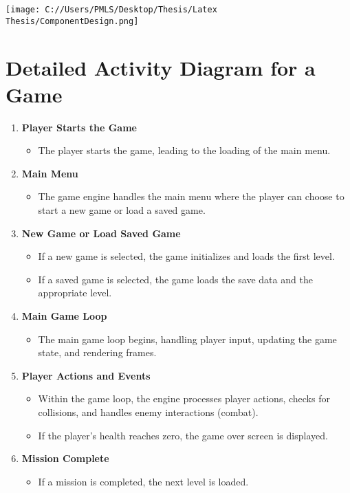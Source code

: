 \texttt{[image: C://Users/PMLS/Desktop/Thesis/Latex Thesis/ComponentDesign.png]}

\section{Detailed Activity Diagram for a Game}

\begin{enumerate}
	\item \textbf{Player Starts the Game}
	\begin{itemize}
		\item The player starts the game, leading to the loading of the main menu.
	\end{itemize}
	
	\item \textbf{Main Menu}
	\begin{itemize}
		\item The game engine handles the main menu where the player can choose to start a new game or load a saved game.
	\end{itemize}
	
	\item \textbf{New Game or Load Saved Game}
	\begin{itemize}
		\item If a new game is selected, the game initializes and loads the first level.
		\item If a saved game is selected, the game loads the save data and the appropriate level.
	\end{itemize}
	
	\item \textbf{Main Game Loop}
	\begin{itemize}
		\item The main game loop begins, handling player input, updating the game state, and rendering frames.
	\end{itemize}
	
	\item \textbf{Player Actions and Events}
	\begin{itemize}
		\item Within the game loop, the engine processes player actions, checks for collisions, and handles enemy interactions (combat).
		\item If the player’s health reaches zero, the game over screen is displayed.
	\end{itemize}
	
	\item \textbf{Mission Complete}
	\begin{itemize}
		\item If a mission is completed, the next level is loaded.
	\end{itemize}
	

\end{enumerate}
